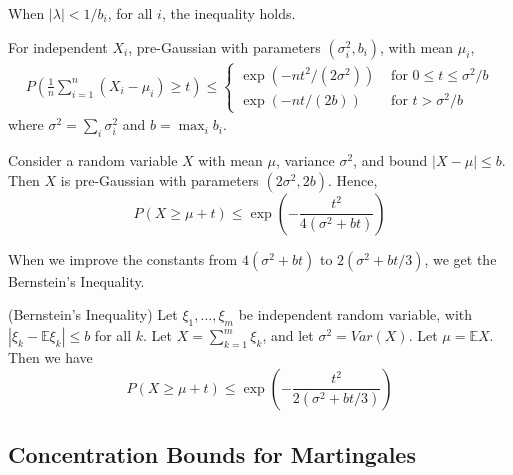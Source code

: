 When $\left| \lambda \right| < 1/b_i$, for all $i$, the inequality holds.

\begin{corollary} \cite*{Bartlett:2020}
  For independent $X_i$, pre-Gaussian with parameters $(\sigma_{i}^2 , b_i)$, with mean $\mu_i$,
  \begin{equation}
    \begin{array}{l}
    P\left(\frac{1}{n} \sum_{i=1}^{n}\left(X_{i}-\mu_{i}\right) \geq t\right) \leq\left\{\begin{array}{ll}
    \exp \left(-n t^{2} /\left(2 \sigma^{2}\right)\right) & \text { for } 0 \leq t \leq \sigma^{2} / b \\
    \exp (-n t /(2 b)) & \text { for } t>\sigma^{2} / b
    \end{array}\right. 
    
    \end{array}
    \end{equation}
    where $\sigma^{2}=\sum_{i} \sigma_{i}^{2}$ and $b=\max _{i} b_{i}$.
\end{corollary} 


Consider a random variable $X$ with mean $\mu$, variance $\sigma^2$, and bound $\left| X-\mu \right| \leq b$.
Then $X$ is pre-Gaussian with parameters $(2\sigma^2 , 2b)$. Hence,
\begin{equation}
  P(X \geq \mu+t) \leq \exp \left(-\frac{t^{2}}{4\left(\sigma^{2}+b t\right)}\right)
\end{equation}

When we improve the constants from $4\left(\sigma^{2}+b t\right)$ to $2(\sigma^2 + bt/3)$, we get the Bernstein's Inequality.

\begin{theorem} (Bernstein's Inequality)\cite*{Kutin:2002}
  Let $\xi_{1}, \dots, \xi_{m}$ be independent random variable, with $\left| \xi_k - \mathbb{E}\xi_k \right| \leq b$ for all $k$. 
  Let $X = \sum_{k=1}^{m} \xi_k$, and let $\sigma^2 = Var(X)$.
  Let $\mu = \mathbb{E}X$. Then we have
  \begin{equation}
    P(X \geq \mu+t) \leq \exp \left(-\frac{t^{2}}{2(\sigma^2 + bt/3)}\right)
  \end{equation}  
\end{theorem}

\subsection{Concentration Bounds for Martingales}

